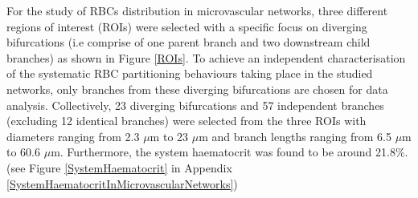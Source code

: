 \noindent For the study of RBCs distribution in microvascular networks, three different regions of interest (ROIs) were selected with a specific focus on diverging bifurcations (i.e comprise of one parent branch and two downstream child branches) as shown in Figure \ref{ROIs}. To achieve an independent characterisation of the systematic RBC partitioning behaviours taking place in the studied networks, only branches from these diverging bifurcations are chosen for data analysis. Collectively, 23 diverging bifurcations and 57 independent branches (excluding 12 identical branches) were selected from the three ROIs with diameters ranging from 2.3 $\mu$m to 23 $\mu$m and branch lengths ranging from 6.5 $\mu$m to 60.6 $\mu$m. Furthermore, the system haematocrit was found to be around 21.8\%. (see Figure \ref{SystemHaematocrit} in Appendix \ref{SystemHaematocritInMicrovascularNetworks})

